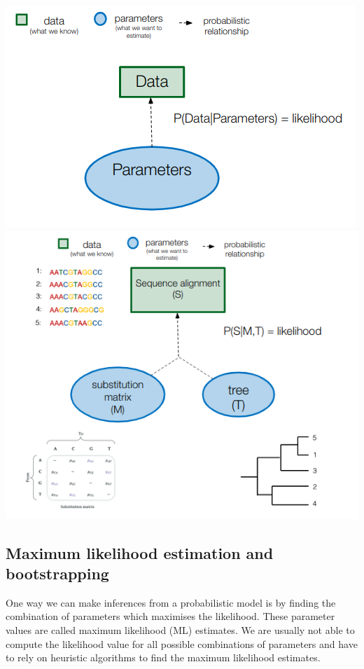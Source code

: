 \documentclass[
  letterpaper,
]{book}
\begin{document}
\includegraphics{assets/images/chapters/phylogenomics/19.png}\\
\includegraphics{assets/images/chapters/phylogenomics/20.png}

\hypertarget{maximum-likelihood-estimation-and-bootstrapping}{%
\subsection{Maximum likelihood estimation and
bootstrapping}\label{maximum-likelihood-estimation-and-bootstrapping}}

One way we can make inferences from a probabilistic model is by finding
the combination of parameters which maximises the likelihood. These
parameter values are called maximum likelihood (ML) estimates. We are
usually not able to compute the likelihood value for all possible
combinations of parameters and have to rely on heuristic algorithms to
find the maximum likelihood estimates.
\end{document}
